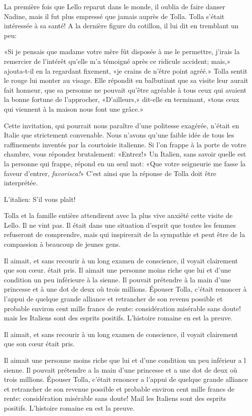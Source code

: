 La première fois que Lello reparut dans le monde, il oublia de faire
danser Nadine, mais il fut plus empressé que jamais auprès de Tolla.
Tolla s'était intéressée à sa santé! A la dernière figure du cotillon,
il lui dit en tremblant un peu:

«Si je pensais que madame votre mère fût disposée à me le permettre,
j'irais la remercier de l'intérêt qu'elle m'a témoigné après ce ridicule
accident; mais,» ajouta-t-il en la regardant fixement, «je crains de
n'être point agréé.» Tolla sentit le rouge lui monter au visage. Elle
répondit en balbutiant que sa visite leur aurait fait honneur, que sa
personne ne pouvait qu'être agréable à tous ceux qui avaient la bonne
fortune de l'approcher, «D'ailleurs,» dit-elle en terminant, «tous ceux
qui viennent à la maison nous font une grâce.»

Cette invitation, qui pourrait nous paraître d'une politesse exagérée,
n'était en Italie que strictement convenable. Nous n'avons qu'une faible
idée de tous les raffinements inventés par la courtoisie italienne. Si
l'on frappe à la porte de votre chambre, vous répondez brutalement:
«Entrez!» Un Italien, sans savoir quelle est la personne qui frappe,
répond en un seul mot: «Que votre seigneurie me fasse la faveur
d'entrer, \emph{favorisca!}» C'est ainsi que la réponse de Tolla doit
être interprétée.

L'italien: S'il vous plaît!

Tolla et la famille entière attendirent avec la plus vive anxiété cette
visite de Lello. Il ne vint pas. Il était dans une situation d'esprit
que toutes les femmes refuseront de comprendre, mais qui inspirerait de
la sympathie et peut être de la compassion à beaucoup de jeunes gens.

Il aimait, et sans recourir à un long examen de conscience, il voyait
clairement que son cœur. était pris. Il aimait une personne moins riche
que lui et d'une condition un peu inférieure à la sienne. Il pouvait
prétendre à la main d'une princesse et à une dot de deux où trois
millions. Épouser Tolla, c'était renoncer à l'appui de quelque grande
alliance et retrancher de son revenu possible et probable environ cent
mille francs de rente: considération misérable sans doute! mais les
Italiens sont des esprits positifs. L'histoire romaine en est la preuve.

Il aimait, et sans recourir à un long examen de conscience, il voyait
clairement que son cœur était pris.

Il aimait une personne moins riche que lui et d'une condition un peu
inférieur a l sienne. Il pouvait prétendre a la main d'une princesse et
a une dot de deux où trois millions. Épouser Tolla, c'était renoncer a
l'appui de quelque grande alliance et retrancher de son revenue possible
et probable environ cent mille francs de rente: considération misérable
sans doute! Mail les Italiens sont des esprits positifs. L'histoire
romaine en est la preuve.

